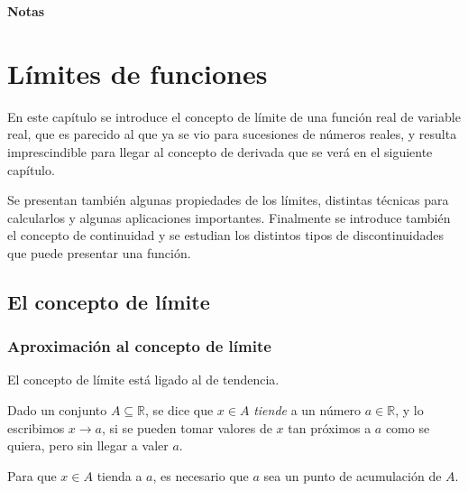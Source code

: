 \documentclass[
  a4paper,
]{scrreport}
\theoremstyle{plain}
\theoremstyle{plain}
\theoremstyle{definition}
\theoremstyle{definition}
\theoremstyle{plain}
\theoremstyle{remark}
\begin{document}
\textbf{Notas}


\hypertarget{luxedmites-de-funciones}{%
\chapter{Límites de funciones}\label{luxedmites-de-funciones}}

En este capítulo se introduce el concepto de límite de una función real
de variable real, que es parecido al que ya se vio para sucesiones de
números reales, y resulta imprescindible para llegar al concepto de
derivada que se verá en el siguiente capítulo.

Se presentan también algunas propiedades de los límites, distintas
técnicas para calcularlos y algunas aplicaciones importantes. Finalmente
se introduce también el concepto de continuidad y se estudian los
distintos tipos de discontinuidades que puede presentar una función.

\hypertarget{el-concepto-de-luxedmite}{%
\section{El concepto de límite}\label{el-concepto-de-luxedmite}}

\hypertarget{aproximaciuxf3n-al-concepto-de-luxedmite}{%
\subsection{Aproximación al concepto de
límite}\label{aproximaciuxf3n-al-concepto-de-luxedmite}}

El concepto de límite está ligado al de tendencia.

Dado un conjunto \(A\subseteq \mathbb{R}\), se dice que \(x\in A\)
\emph{tiende} a un número \(a\in\mathbb{R}\), y lo escribimos
\(x\to a\), si se pueden tomar valores de \(x\) tan próximos a \(a\)
como se quiera, pero sin llegar a valer \(a\).

\begin{tcolorbox}[enhanced jigsaw, breakable, bottomrule=.15mm, coltitle=black, bottomtitle=1mm, opacityback=0, title=\textcolor{quarto-callout-warning-color}{\faExclamationTriangle}\hspace{0.5em}{Advertencia}, left=2mm, toptitle=1mm, toprule=.15mm, opacitybacktitle=0.6, colframe=quarto-callout-warning-color-frame, arc=.35mm, colback=white, rightrule=.15mm, titlerule=0mm, leftrule=.75mm, colbacktitle=quarto-callout-warning-color!10!white]

Para que \(x\in A\) tienda a \(a\), es necesario que \(a\) sea un punto
de acumulación de \(A\).

\end{tcolorbox}
\end{document}
